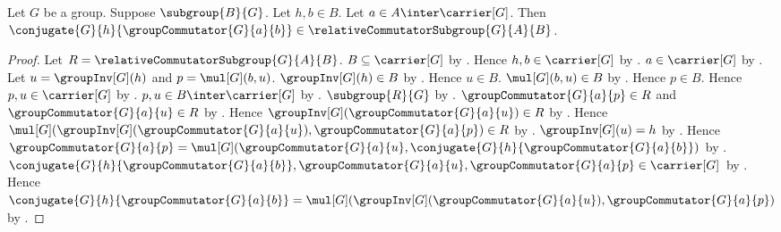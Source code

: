 \begin{lemma}\label{right_subgroup_conjugates_relative_commutator_generator}
    Let $G$ be a group.
    Suppose $\subgroup{B}{G}$.
    Let $h,b\in B$.
    Let $a\in A\inter\carrier[G]$.
    Then
        $\conjugate{G}{h}{\groupCommutator{G}{a}{b}}\in
            \relativeCommutatorSubgroup{G}{A}{B}$.
\end{lemma}
\begin{proof}
    Let $R=\relativeCommutatorSubgroup{G}{A}{B}$.
    $B\subseteq\carrier[G]$ by .
    Hence $h,b\in\carrier[G]$ by .
    $a\in\carrier[G]$ by .
    Let $u=\groupInv[G](h)$ and $p=\mul[G](b,u)$.
    $\groupInv[G](h)\in B$ by .
    Hence $u\in B$.
    $\mul[G](b,u)\in B$ by .
    Hence $p\in B$.
    Hence $p,u\in\carrier[G]$ by .
    $p,u\in B\inter\carrier[G]$ by .
    $\subgroup{R}{G}$ by
        .
    $\groupCommutator{G}{a}{p}\in R$ and
        $\groupCommutator{G}{a}{u}\in R$ by
        .
    Hence $\groupInv[G](\groupCommutator{G}{a}{u})\in R$ by
        .
    Hence
        $\mul[G](
            \groupInv[G](\groupCommutator{G}{a}{u}),
            \groupCommutator{G}{a}{p})\in R$ by
        .
    $\groupInv[G](u)=h$ by
        .
    Hence
        $\groupCommutator{G}{a}{p}=
            \mul[G](
                \groupCommutator{G}{a}{u},
                \conjugate{G}{h}{\groupCommutator{G}{a}{b}})$ by
        .
    $\conjugate{G}{h}{\groupCommutator{G}{a}{b}},
        \groupCommutator{G}{a}{u},
        \groupCommutator{G}{a}{p}\in\carrier[G]$ by
        .
    Hence
        $\conjugate{G}{h}{\groupCommutator{G}{a}{b}}=
            \mul[G](
                \groupInv[G](\groupCommutator{G}{a}{u}),
                \groupCommutator{G}{a}{p})$ by
        .
\end{proof}

